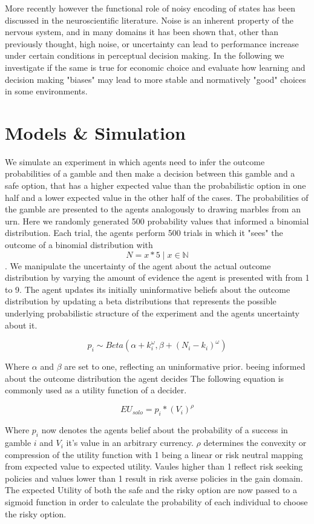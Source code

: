 \documentclass[apa]{article}
\begin{document}
More recently however the functional role of noisy encoding of states has been discussed in the neuroscientific literature. Noise is an inherent property of the nervous system, and in many domains it has been shown that, other than previously thought, high noise, or uncertainty can lead to  performance increase under certain conditions in perceptual decision making. 
In the following we investigate if the same is true for economic choice and evaluate how learning and decision making "biases" may lead to more stable and normatively "good" choices in some environments. 

\section{Models \& Simulation}
We simulate an experiment in which agents need to infer the outcome probabilities of a gamble and then make a decision between this gamble and a safe
option, that has a higher expected value than the probabilistic option in one half and a lower expected value in the other half of the cases. The
probabilities of the gamble are presented to the agents analogously to drawing marbles from an urn. Here we randomly generated 500 probability values that
informed a binomial distribution. Each trial, the agents perform 500 trials in which it "sees" the outcome of a binomial distribution with $$ N = x*5 \mid
 x \in \mathbb{N} $$. We manipulate the uncertainty of the agent about the actual outcome distribution by varying the amount of evidence the agent is
presented with from 1 to 9. The agent updates its initially uninformative beliefs about the outcome distribution by updating a beta distributions that
represents the possible underlying probabilistic structure of the experiment and the agents uncertainty about it.

 \begin{equation}
 p_i \sim Beta(\alpha + k_i^{\omega} , \beta + (N_i-k_i)^\omega)
 \end{equation}
 
Where $\alpha$ and $\beta$ are set to one, reflecting an uninformative prior. beeing informed about the outcome distribution the agent decides 
The following equation is commonly used as a utility function of a decider.

\begin{equation}
EU_{solo} = p_i*(V_i)^\rho
\end{equation}

Where \(p_i\) now denotes the agents belief about the probability of a success in gamble \(i\) and \(V_i\) it's value in an arbitrary currency. $\rho$ determines the convexity or compression of the utility function with 1 being a linear or risk neutral mapping from expected value to expected utility. Vaules higher than 1 reflect risk seeking policies and values lower than 1 result in risk averse policies in the gain domain. 
The expected Utility of both the safe and the risky option are now passed to a sigmoid function in order to calculate the probability of each individual to choose the risky option.
\end{document}
